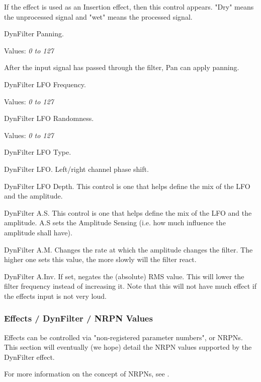    If the effect is used as an Insertion effect, then this control appears.
   "Dry" means the unprocessed signal and "wet" means the processed signal.

   DynFilter Panning.

   Values: \textsl{0 to 127}

   After the input signal has passed through the filter, Pan can apply
   panning.

   DynFilter LFO Frequency.

   Values: \textsl{0 to 127}

   DynFilter LFO Randomness.

   Values: \textsl{0 to 127}

   DynFilter LFO Type.

   DynFilter LFO.
   Left/right channel phase shift.

   DynFilter LFO Depth.
   This control is one that helps define the mix of the LFO and the
   amplitude.

   DynFilter A.S.
   This control is one that helps define the mix of the LFO and the
   amplitude.
   A.S sets the Amplitude Sensing (i.e. how much influence the amplitude
   shall have).

   DynFilter A.M.
   Changes the rate at which the amplitude changes the filter. The higher
   one sets this value, the more slowly will the filter react.

   DynFilter A.Inv.
   If set, negates the (absolute) RMS value. This will lower the filter
   frequency instead of increasing it. Note that this will not have much
   effect if the effects input is not very loud.

\subsubsection{Effects / DynFilter / NRPN Values}
\label{subsubsec:effects_edit_dynfilter_nrpn}

   Effects can be controlled via "non-registered parameter numbers", or NRPNs.
   This section will eventually (we hope)
   detail the NRPN values supported by the DynFilter effect.

   For more information on the concept of NRPNs, see
   .

